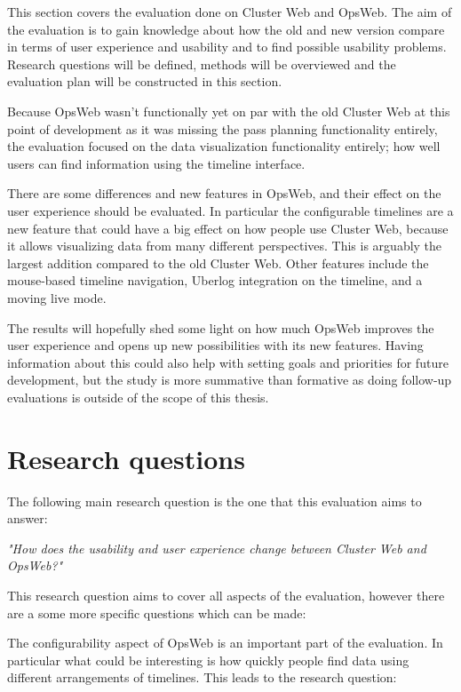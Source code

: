 
This section covers the evaluation done on Cluster Web and OpsWeb. The aim of the evaluation is to gain knowledge about how the old and new version compare in terms of user experience and usability and to find possible usability problems. Research questions will be defined, methods will be overviewed and the evaluation plan will be constructed in this section.

Because OpsWeb wasn't functionally yet on par with the old Cluster Web at this point of development as it was missing the pass planning functionality entirely, the evaluation focused on the data visualization functionality entirely; how well users can find information using the timeline interface.

There are some differences and new features in OpsWeb, and their effect on the user experience should be evaluated. In particular the configurable timelines are a new feature that could have a big effect on how people use Cluster Web, because it allows visualizing data from many different perspectives. This is arguably the largest addition compared to the old Cluster Web. Other features include the mouse-based timeline navigation, Uberlog integration on the timeline, and a moving live mode.

The results will hopefully shed some light on how much OpsWeb improves the user experience and opens up new possibilities with its new features. Having information about this could also help with setting goals and priorities for future development, but the study is more summative than formative as doing follow-up evaluations is outside of the scope of this thesis. \cite{albert2013measuring}

\section{Research questions} \label{research_questions}
The following main research question is the one that this evaluation aims to answer:

\textit{"How does the usability and user experience change between Cluster Web and OpsWeb?"}

This research question aims to cover all aspects of the evaluation, however there are a some more specific questions which can be made:

The configurability aspect of OpsWeb is an important part of the evaluation. In particular what could be interesting is how quickly people find data using different arrangements of timelines. This leads to the research question:

